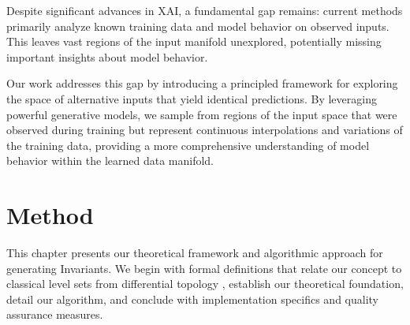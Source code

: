 \documentclass[licencjacka,en]{pracamgr}
\newcommand{\framework}[1]{Invariants}  %
\begin{document}
Despite significant advances in XAI, a fundamental gap remains: current methods primarily analyze known training data and model behavior on observed inputs. This leaves vast regions of the input manifold unexplored, potentially missing important insights about model behavior.

Our work addresses this gap by introducing a principled framework for exploring the space of alternative inputs that yield identical predictions. By leveraging powerful generative models, we sample from regions of the input space that were observed during training but represent continuous interpolations and variations of the training data, providing a more comprehensive understanding of model behavior within the learned data manifold.
\chapter{Method}\label{r:method}

This chapter presents our theoretical framework and algorithmic approach for generating \framework{}. We begin with formal definitions that relate our concept to classical level sets from differential topology \citep{lee2013smooth,milnor1965topology,fort2017gaussian}, establish our theoretical foundation, detail our algorithm, and conclude with implementation specifics and quality assurance measures.
\end{document}
